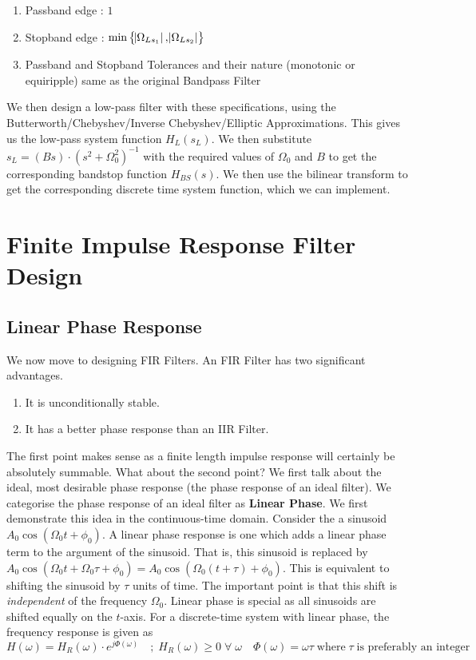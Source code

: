 \documentclass{article}
\theoremstyle{definition}
\begin{document}
\begin{enumerate}
    \item Passband edge : $1$
    \item Stopband edge : $\min \left\{ \abs{\Omega_{Ls_1}} , \abs{\Omega_{Ls_2}}\right\}$
    \item Passband and Stopband Tolerances and their nature (monotonic or equiripple) same as the original Bandpass Filter
\end{enumerate}

We then design a low-pass filter with these specifications, using the Butterworth/Chebyshev/Inverse Chebyshev/Elliptic Approximations. This gives us the low-pass system function $H_L(s_L)$. We then substitute $s_L =  (Bs) \cdot (s^2 + \Omega_0^2)^{-1}$ with the required values of $\Omega_0$ and $B$ to get the corresponding bandstop function $H_{BS}(s)$. We then use the bilinear transform to get the corresponding discrete time system function, which we can implement.

\section{Finite Impulse Response Filter Design}

\subsection{Linear Phase Response}

We now move to designing FIR Filters. An FIR Filter has two significant advantages. 
\begin{enumerate}
    \item It is unconditionally stable. 
    \item It has a better phase response than an IIR Filter.
\end{enumerate}

The first point makes sense as a finite length impulse response will certainly be absolutely summable. What about the second point? We first talk about the ideal, most desirable phase response (the phase response of an ideal filter). We categorise the phase response of an ideal filter as \textbf{Linear Phase}. We first demonstrate this idea in the continuous-time domain. Consider the a sinusoid $A_0 \cos (\Omega_0 t + \phi_0)$. A linear phase response is one which adds a linear phase term to the argument of the sinusoid. That is, this sinusoid is replaced by $A_0 \cos (\Omega_0 t + \Omega_0 \tau + \phi_0) = A_0 \cos (\Omega_0 (t + \tau) + \phi_0)$. This is equivalent to shifting the sinusoid by $\tau$ units of time. The important point is that this shift is \textit{independent} of the frequency $\Omega_0$. Linear phase is special as all sinusoids are shifted equally on the $t$-axis. For a discrete-time system with linear phase, the frequency response is given as 
\[
    H(\omega) = H_R(\omega) \cdot e^{j \Phi(\omega)} \quad ; \; H_R(\omega) \geq 0 \; \forall \; \omega \quad \Phi(\omega) = \omega \tau \; \text{where} \; \tau \; \text{is preferably an integer}
\]
\end{document}
